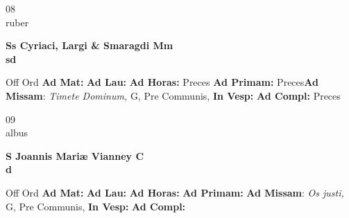 \documentclass[10pt, openany]{book}
\begin{document}
    \begin{center}
        \begin{minipage}{3.5in}
            \vspace{2em}
            \begin{minipage}{0.5in}
                {\Huge 08} \\
                {\normalsize ruber}
            \end{minipage}
            \begin{minipage}{3.0in}
                \textbf{ \large Ss Cyriaci, Largi \& Smaragdi Mm \\
                \textnormal{\normalsize sd}}

            \end{minipage}
            \begin{justify}Off Ord
                \textbf{Ad Mat: }
                \textbf{Ad Lau: }
                \textbf{Ad Horas: }Preces
                \textbf{Ad Primam: }Preces\textbf{Ad Missam}: \textit{Timete Dominum,} G, Pre Communis, 
                \textbf{In Vesp: }
                \textbf{Ad Compl: }Preces
            \end{justify}
        \end{minipage}
    \end{center}

    \begin{center}
        \begin{minipage}{3.5in}
            \vspace{2em}
            \begin{minipage}{0.5in}
                {\Huge 09} \\
                {\normalsize albus}
            \end{minipage}
            \begin{minipage}{3.0in}
                \textbf{ \large S Joannis Mariæ Vianney C \\
                \textnormal{\normalsize d}}

            \end{minipage}
            \begin{justify}Off Ord
                \textbf{Ad Mat: }
                \textbf{Ad Lau: }
                \textbf{Ad Horas: }
                \textbf{Ad Primam: }\textbf{Ad Missam}: \textit{Os justi,} G, Pre Communis, 
                \textbf{In Vesp: }
                \textbf{Ad Compl: }
            \end{justify}
        \end{minipage}
    \end{center}
\end{document}

